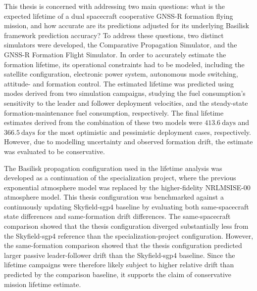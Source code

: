 
This thesis is concerned with addressing two main questions: what is the expected lifetime of a dual spacecraft cooperative GNSS-R formation flying mission, and how accurate are its predictions adjusted for its underlying Basilisk framework prediction accuracy? To address these questions, two distinct simulators were developed, the Comparative Propagation Simulator, and the GNSS-R Formation Flight Simulator. In order to accurately estimate the formation lifetime, its operational constraints had to be modeled, including the satellite configuration, electronic power system, autonomous mode switching, attitude- and formation control. The estimated lifetime was predicted using modes derived from two simulation campaigns, studying the fuel consumption's sensitivity to the leader and follower deployment velocities, and the steady-state formation-maintenance fuel consumption, respectively. The final lifetime estimates derived from the combination of these two models were $413.6~\mathrm{days}$ and $366.5~\mathrm{days}$ for the most optimistic and pessimistic deployment cases, respectively. However, due to modelling uncertainty and observed formation drift, the estimate was evaluated to be conservative.


The Basilisk propagation configuration used in the lifetime analysis was developed as a continuation of the specialization project, where the previous exponential atmosphere model was replaced by the higher-fidelity NRLMSISE-00 atmosphere model. This thesis configuration was benchmarked against a continuously updating Skyfield-\gls{sgp4} baseline by evaluating both same-spacecraft state differences and same-formation drift differences. The same-spacecraft comparison showed that the thesis configuration diverged substantially less from the Skyfield-\gls{sgp4} reference than the specialization-project configuration. However, the same-formation comparison showed that the thesis configuration predicted larger passive leader-follower drift than the Skyfield-\gls{sgp4} baseline. Since the lifetime campaigns were therefore likely subject to higher relative drift than predicted by the comparison baseline, it supports the claim of conservative mission lifetime estimate.
